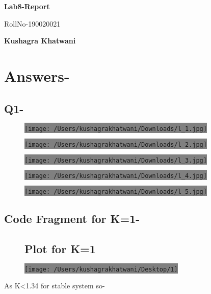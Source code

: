 \documentclass[12pt,A4paper]{article}
\begin{document}
        \begin{center}
        \vspace*{1cm}    
        \Huge
        \textbf{Lab8-Report}
            
        \vspace{0.5cm}
        \LARGE
        RollNo-190020021
            
        \vspace{0.5cm}
            
        \textbf{Kushagra Khatwani}
	\end{center}
	
	\vspace{.5cm}
	
	\section*{Answers-}
	\subsection*{Q1-}
	\begin{figure}[H]
		\centering
		\colorbox{gray}{\texttt{[image: /Users/kushagrakhatwani/Downloads/l\_1.jpg]}}
	\end{figure}
	\begin{figure}[H]
		\centering
		\colorbox{gray}{\texttt{[image: /Users/kushagrakhatwani/Downloads/l\_2.jpg]}}
	\end{figure}
	\begin{figure}[H]
		\centering
		\colorbox{gray}{\texttt{[image: /Users/kushagrakhatwani/Downloads/l\_3.jpg]}}
	\end{figure}
\begin{figure}[H]
		\centering
		\colorbox{gray}{\texttt{[image: /Users/kushagrakhatwani/Downloads/l\_4.jpg]}}
	\end{figure}
\begin{figure}[H]
		\centering
		\colorbox{gray}{\texttt{[image: /Users/kushagrakhatwani/Downloads/l\_5.jpg]}}
	\end{figure}
	\subsection*{Code Fragment for K=1-}
	
\begin{figure}[H]
	\subsection*{Plot for K=1}
		\centering
		\colorbox{gray}{\texttt{[image: /Users/kushagrakhatwani/Desktop/1]}}
	\end{figure}
	As K<1.34 for stable system so-
\end{document}
